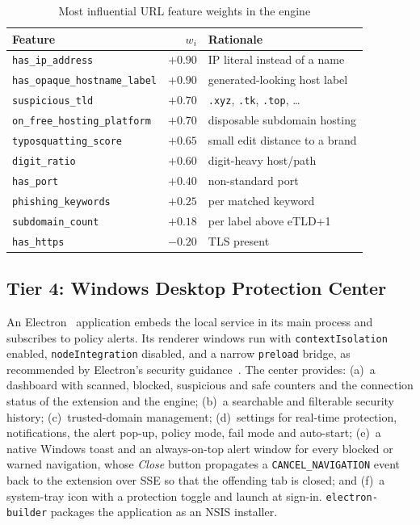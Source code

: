 \documentclass[conference]{IEEEtran}
\newcommand{\code}[1]{\texttt{\small #1}}
\begin{document}
\begin{table}[t]
\centering
\caption{Most influential URL feature weights in the engine}
\label{tab:weights}
\begin{tabular}{@{}lrl@{}}
\toprule
Feature & $w_i$ & Rationale \\
\midrule
\code{has\_ip\_address}          & $+0.90$ & IP literal instead of a name \\
\code{has\_opaque\_hostname\_label}& $+0.90$ & generated-looking host label \\
\code{suspicious\_tld}           & $+0.70$ & \code{.xyz}, \code{.tk}, \code{.top}, \dots \\
\code{on\_free\_hosting\_platform} & $+0.70$ & disposable subdomain hosting \\
\code{typosquatting\_score}      & $+0.65$ & small edit distance to a brand \\
\code{digit\_ratio}              & $+0.60$ & digit-heavy host/path \\
\code{has\_port}                 & $+0.40$ & non-standard port \\
\code{phishing\_keywords}        & $+0.25$ & per matched keyword \\
\code{subdomain\_count}          & $+0.18$ & per label above eTLD+1 \\
\code{has\_https}                & $-0.20$ & TLS present \\
\bottomrule
\end{tabular}
\end{table}

\subsection{Tier 4: Windows Desktop Protection Center}
\label{sec:desktop}
An Electron~\cite{electron} application embeds the local service in its main
process and subscribes to policy alerts. Its renderer windows run with
\code{contextIsolation} enabled, \code{nodeIntegration} disabled, and a
narrow \code{preload} bridge, as recommended by Electron's security
guidance~\cite{electronsec}. The center provides:
(a)~a dashboard with scanned, blocked, suspicious and safe counters and the
connection status of the extension and the engine;
(b)~a searchable and filterable security history;
(c)~trusted-domain management;
(d)~settings for real-time protection, notifications, the alert pop-up,
policy mode, fail mode and auto-start;
(e)~a native Windows toast and an always-on-top alert window for every
blocked or warned navigation, whose \emph{Close} button propagates a
\code{CANCEL\_NAVIGATION} event back to the extension over SSE so that the
offending tab is closed; and
(f)~a system-tray icon with a protection toggle and launch at sign-in.
\code{electron-builder} packages the application as an NSIS installer.
\end{document}
